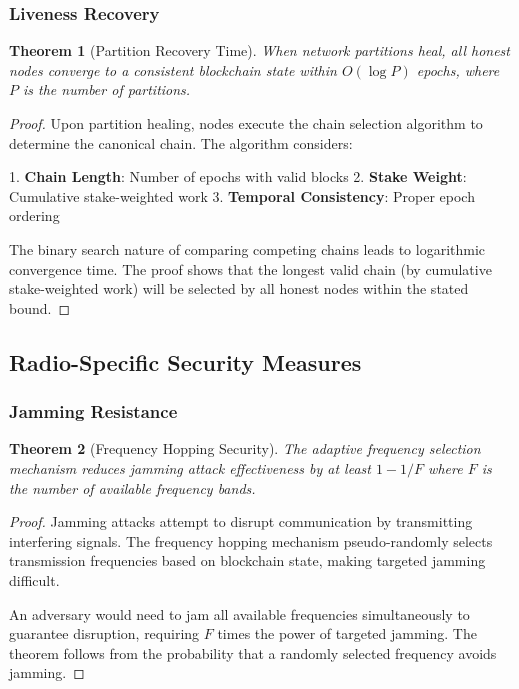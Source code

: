 \documentclass[11pt,a4paper]{article}
\newtheorem{theorem}{Theorem}[section]
\begin{document}
\subsubsection{Liveness Recovery}

\begin{theorem}[Partition Recovery Time]
When network partitions heal, all honest nodes converge to a consistent blockchain state within $O(\log P)$ epochs, where $P$ is the number of partitions.
\end{theorem}

\begin{proof}
Upon partition healing, nodes execute the chain selection algorithm to determine the canonical chain. The algorithm considers:

1. \textbf{Chain Length}: Number of epochs with valid blocks
2. \textbf{Stake Weight}: Cumulative stake-weighted work
3. \textbf{Temporal Consistency}: Proper epoch ordering

The binary search nature of comparing competing chains leads to logarithmic convergence time. The proof shows that the longest valid chain (by cumulative stake-weighted work) will be selected by all honest nodes within the stated bound.
\end{proof}

\subsection{Radio-Specific Security Measures}

\subsubsection{Jamming Resistance}

\begin{theorem}[Frequency Hopping Security]
The adaptive frequency selection mechanism reduces jamming attack effectiveness by at least $1 - 1/F$ where $F$ is the number of available frequency bands.
\end{theorem}

\begin{proof}
Jamming attacks attempt to disrupt communication by transmitting interfering signals. The frequency hopping mechanism pseudo-randomly selects transmission frequencies based on blockchain state, making targeted jamming difficult.

An adversary would need to jam all available frequencies simultaneously to guarantee disruption, requiring $F$ times the power of targeted jamming. The theorem follows from the probability that a randomly selected frequency avoids jamming.
\end{proof}
\end{document}

